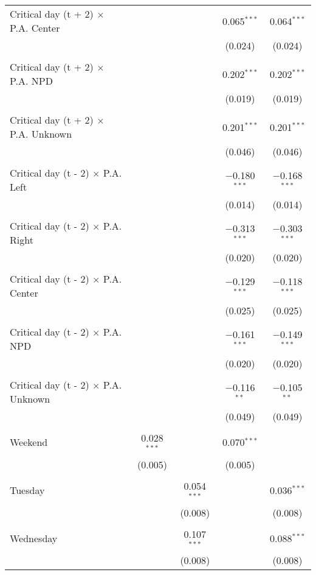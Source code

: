 \documentclass[
]{article}
\begin{document}
\begin{table}[!htbp]
{\begin{tabular}{@{\extracolsep{5pt}}lcccc}
 Critical day (t + 2) $\times$ P.A. Center &  &  & 0.065$^{***}$ & 0.064$^{***}$ \\ 
  &  &  & (0.024) & (0.024) \\ 
  & & & & \\ 
 Critical day (t + 2) $\times$ P.A. NPD &  &  & 0.202$^{***}$ & 0.202$^{***}$ \\ 
  &  &  & (0.019) & (0.019) \\ 
  & & & & \\ 
 Critical day (t + 2) $\times$ P.A. Unknown &  &  & 0.201$^{***}$ & 0.201$^{***}$ \\ 
  &  &  & (0.046) & (0.046) \\ 
  & & & & \\ 
 Critical day (t - 2) $\times$ P.A. Left &  &  & $-$0.180$^{***}$ & $-$0.168$^{***}$ \\ 
  &  &  & (0.014) & (0.014) \\ 
  & & & & \\ 
 Critical day (t - 2) $\times$ P.A. Right &  &  & $-$0.313$^{***}$ & $-$0.303$^{***}$ \\ 
  &  &  & (0.020) & (0.020) \\ 
  & & & & \\ 
 Critical day (t - 2) $\times$ P.A. Center &  &  & $-$0.129$^{***}$ & $-$0.118$^{***}$ \\ 
  &  &  & (0.025) & (0.025) \\ 
  & & & & \\ 
 Critical day (t - 2) $\times$ P.A. NPD &  &  & $-$0.161$^{***}$ & $-$0.149$^{***}$ \\ 
  &  &  & (0.020) & (0.020) \\ 
  & & & & \\ 
 Critical day (t - 2) $\times$ P.A. Unknown &  &  & $-$0.116$^{**}$ & $-$0.105$^{**}$ \\ 
  &  &  & (0.049) & (0.049) \\ 
  & & & & \\ 
 Weekend & 0.028$^{***}$ &  & 0.070$^{***}$ &  \\ 
  & (0.005) &  & (0.005) &  \\ 
  & & & & \\ 
 Tuesday &  & 0.054$^{***}$ &  & 0.036$^{***}$ \\ 
  &  & (0.008) &  & (0.008) \\ 
  & & & & \\ 
 Wednesday &  & 0.107$^{***}$ &  & 0.088$^{***}$ \\ 
  &  & (0.008) &  & (0.008) \\ 

\end{tabular}}
\end{table}
\end{document}
